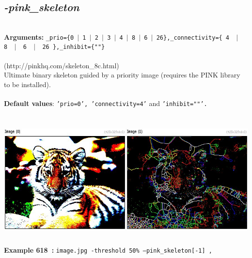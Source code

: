 \documentclass[a4paper,11pt,twoside]{book}
\begin{document}
\subsection{\emph{-pink\_skeleton} }\vspace*{-0.5em}
~\\\textbf{Arguments: } 
{\small \texttt{\_prio=\{0~$|$~1~$|$~2~$|$~3~$|$~4~$|$~8~$|$~6~$|$~26\},\_connectivity=\{ 4 ~$|$~ 8 ~$|$~ 6 ~$|$~ 26 \},\_inhibit=\{""\}}}\\~\\
(http://pinkhq.com/skeleton\_8c.html)
~\\Ultimate binary skeleton guided by a priority image (requires the PINK library to be installed).
~\\~\\\textbf{Default values}: {\small \texttt{'prio=0', 'connectivity=4'} and \texttt{'inhibit=""'.}}
\begin{center}\includegraphics[keepaspectratio=true,height=7cm,width=\textwidth]{img/gmic_def618.jpg}\\
{\footnotesize \textbf{Example 618~:} \texttt{image.jpg -threshold 50\% --pink\_skeleton[-1] ,}}
\end{center}
\end{document}
